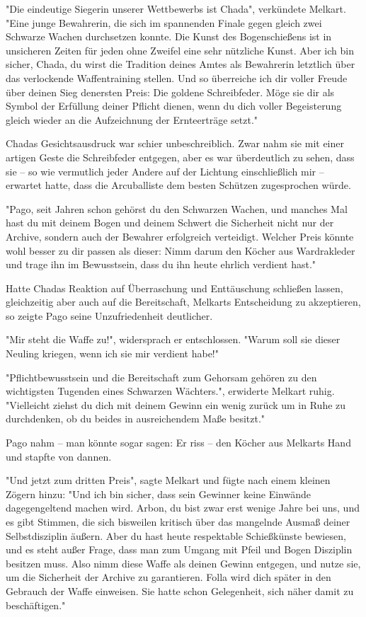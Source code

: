 \documentclass[10pt, a4paper, oneside]{book}
\begin{document}
\begin{multicols}{2}
"Die eindeutige Siegerin unserer Wettbewerbs ist Chada", verkündete Melkart. "Eine junge Bewahrerin, die sich im spannenden Finale gegen gleich zwei Schwarze Wachen durchsetzen konnte. Die Kunst des Bogenschießens ist in unsicheren Zeiten für jeden ohne Zweifel eine sehr nützliche Kunst. Aber ich bin sicher, Chada, du wirst die Tradition deines Amtes als Bewahrerin letztlich über das verlockende Waffentraining stellen. Und so überreiche ich dir voller Freude über deinen Sieg denersten Preis: Die goldene Schreibfeder. Möge sie dir als Symbol der Erfüllung deiner Pflicht dienen, wenn du dich voller Begeisterung gleich wieder an die Aufzeichnung der Ernteerträge setzt."

Chadas Gesichtsausdruck war schier unbeschreiblich. Zwar nahm sie mit einer artigen Geste die Schreibfeder entgegen, aber es war überdeutlich zu sehen, dass sie – so wie vermutlich jeder Andere auf der Lichtung einschließlich mir – erwartet hatte, dass die Arcuballiste dem besten Schützen zugesprochen würde.

"Pago, seit Jahren schon gehörst du den Schwarzen Wachen, und manches Mal hast du mit deinem Bogen und deinem Schwert die Sicherheit nicht nur der Archive, sondern auch der Bewahrer erfolgreich verteidigt. Welcher Preis könnte wohl besser zu dir passen als dieser: Nimm darum den Köcher aus Wardrakleder und trage ihn im Bewusstsein, dass du ihn heute ehrlich verdient hast."

Hatte Chadas Reaktion auf Überraschung und Enttäuschung schließen lassen, gleichzeitig aber auch auf die Bereitschaft, Melkarts Entscheidung zu akzeptieren, so zeigte Pago seine Unzufriedenheit deutlicher.

"Mir steht die Waffe zu!", widersprach er entschlossen. "Warum soll sie dieser Neuling kriegen, wenn ich sie mir verdient habe!"

"Pflichtbewusstsein und die Bereitschaft zum Gehorsam gehören zu den wichtigsten Tugenden eines Schwarzen Wächters.", erwiderte Melkart ruhig. "Vielleicht ziehst du dich mit deinem Gewinn ein wenig zurück um in Ruhe zu durchdenken, ob du beides in ausreichendem Maße besitzt."

Pago nahm – man könnte sogar sagen: Er riss – den Köcher aus Melkarts Hand und stapfte von dannen.

"Und jetzt zum dritten Preis", sagte Melkart und fügte nach einem kleinen Zögern hinzu: "Und ich bin sicher, dass sein Gewinner keine Einwände dagegengeltend machen wird. Arbon, du bist zwar erst wenige Jahre bei uns, und es gibt Stimmen, die sich bisweilen kritisch über das mangelnde Ausmaß deiner Selbstdisziplin äußern. Aber du hast heute respektable Schießkünste bewiesen, und es steht außer Frage, dass man zum Umgang mit Pfeil und Bogen Disziplin besitzen muss. Also nimm diese Waffe als deinen Gewinn entgegen, und nutze sie, um die Sicherheit der Archive zu garantieren. Folla wird dich später in den Gebrauch der Waffe einweisen. Sie hatte schon Gelegenheit, sich näher damit zu beschäftigen."


\end{multicols}
\end{document}
